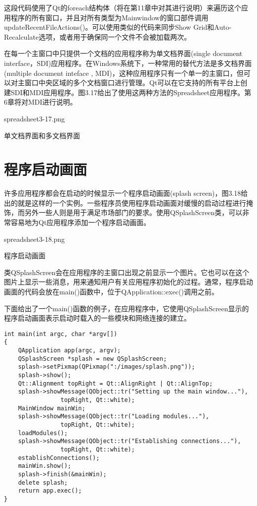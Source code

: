 \documentclass[11pt,oneside]{book}
\begin{document}
\begin{common-format}
这段代码使用了Qt的foreach结构体（将在第11章中对其进行说明）来遍历这个应用程序的所有窗口，并且对所有类型为Mainwindow的窗口部件调用updateRecentFileActions()。可以使用类似的代码来同步Show Grid和Auto-Recalculate选项，或者用于确保同一个文件不会被加载两次。

在每一个主窗口中只提供一个文档的应用程序称为单文档界面(single document interface，SDI)应用程序。在Windows系统下，一种常用的替代方法是多文档界面(multiple document inteface , MDI)，这种应用程序只有一个单一的主窗口，但可以对主窗口中央区域的多个文档窗口进行管理。Qt可以在它支持的所有平台上创建SDI和MDI应用程序。图3.17给出了使用这两种方法的Spreadsheet应用程序。第6章将对MDI进行说明。

\begin{linefig}[0.8]{spreadsheet3-17.png}
\caption{单文档界面和多文档界面}
\label{fig:spreadsheet3-17.png}
\end{linefig}

\section{程序启动画面}
许多应用程序都会在启动的时候显示一个程序启动画面(splash screen)，图3.18给出的就是这样的一个实例。一些程序员使用程序启动画面对缓慢的启动过程进行掩饰，而另外一些人则是用于满足市场部门的要求。使用QSplashScreen类，可以非常容易地为Qt应用程序添加一个程序启动画面。

\begin{linefig}{spreadsheet3-18.png}
\caption{程序启动画面}
\label{fig:spreadsheet3-18.png}
\end{linefig}    

类QSplashScreen会在应用程序的主窗口出现之前显示一个图片。它也可以在这个图片上显示一些消息，用来通知用户有关应用程序初始化的过程。通常，程序启动画面的代码会放在main()函数中，位于QApplication::exec()调用之前。

下面给出了一个main()函数的例子，在应用程序中，它使用QSplashScreen显示的程序启动画面表示启动时载入的一些模块和网络连接的建立。


\begin{Verbatim}
int main(int argc, char *argv[])
{
    QApplication app(argc, argv);
    QSplashScreen *splash = new QSplashScreen;
    splash->setPixmap(QPixmap(":/images/splash.png"));
    splash->show();
    Qt::Alignment topRight = Qt::AlignRight | Qt::AlignTop;
    splash->showMessage(QObject::tr("Setting up the main window..."),
                topRight, Qt::white);
    MainWindow mainWin;
    splash->showMessage(QObject::tr("Loading modules..."),
                topRight, Qt::white);
    loadModules();
    splash->showMessage(QObject::tr("Establishing connections..."),
                topRight, Qt::white);
    establishConnections();
    mainWin.show();
    splash->finish(&mainWin);
    delete splash;
    return app.exec();
}
\end{Verbatim}


\end{common-format}
\end{document}

